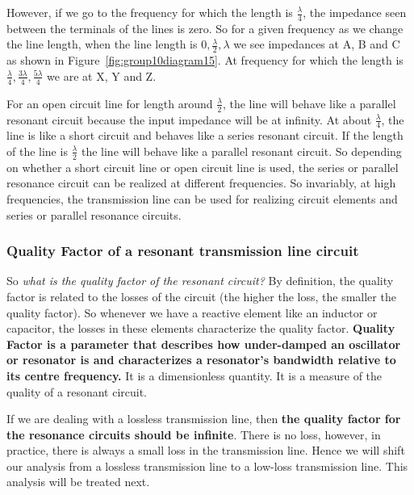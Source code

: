 However, if we go to the frequency for which the length is $ \frac{\lambda}{4} $, the impedance seen between the terminals of the lines is zero. So for a given frequency as we change the line length, when the line
length is $0, \frac{\lambda}{2}, \lambda $ we see impedances at A, B and C as shown in Figure~\ref{fig:group10diagram15}. At frequency for which the length is $ \frac{\lambda}{4}, \frac{3\lambda}{4}, \frac{5\lambda}{4}$ we are at X, Y and Z.

For an open circuit line for length around $\frac{\lambda}{2} $, the line will behave like a parallel resonant circuit because the input impedance will be at infinity. At about $ \frac{\lambda}{4} $, the line is like a short circuit and behaves like a series resonant circuit. If the length of the line is $ \frac{\lambda}{2} $ the line will behave like a parallel resonant circuit.
So depending on whether a short circuit line or open circuit line is used, the series or parallel resonance circuit can be realized at different frequencies. So invariably, at high frequencies, the transmission line can be used for realizing circuit elements and series or parallel resonance circuits.

\subsubsection{Quality Factor of a resonant transmission line circuit}
So \emph{what is the quality factor of the resonant circuit?} By definition, the quality factor is related to the losses of the circuit (the higher the loss, the smaller the quality factor). So whenever we have a reactive element like an inductor or capacitor, the losses in these elements characterize the quality factor. \textbf{Quality Factor is a parameter that describes how under-damped an oscillator or resonator is and characterizes a resonator's bandwidth relative to its centre frequency.} It is a dimensionless quantity. It is a measure of the quality of a resonant circuit. 

If we are dealing with a lossless transmission line, then \textbf{the quality factor for the resonance circuits should be infinite}. There is no loss, however, in practice, there is always a small loss in the transmission line. Hence we will shift our analysis from a lossless transmission line to a low-loss transmission line. This analysis will be treated next.

